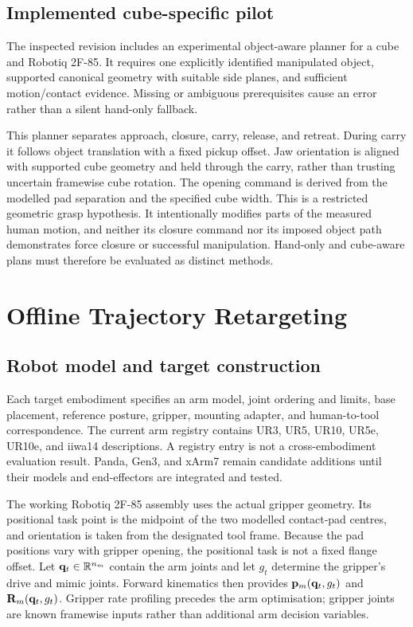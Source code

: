 \subsection{Implemented cube-specific pilot}

The inspected revision includes an experimental object-aware planner for
a cube and Robotiq 2F-85. It requires one explicitly identified manipulated
object, supported canonical geometry with suitable side planes, and
sufficient motion/contact evidence. Missing or ambiguous prerequisites
cause an error rather than a silent hand-only fallback.

This planner separates approach, closure, carry, release, and retreat.
During carry it follows object translation with a fixed pickup offset.
Jaw orientation is aligned with supported cube geometry and held through
the carry, rather than trusting uncertain framewise cube rotation. The
opening command is derived from the modelled pad separation and the
specified cube width. This is a restricted geometric grasp hypothesis.
It intentionally modifies parts of the measured human motion, and neither
its closure command nor its imposed object path demonstrates force closure
or successful manipulation. Hand-only and cube-aware plans must therefore
be evaluated as distinct methods.

\section{Offline Trajectory Retargeting}
\label{sec:retarget}

\subsection{Robot model and target construction}

Each target embodiment specifies an arm model, joint ordering and limits,
base placement, reference posture, gripper, mounting adapter, and
human-to-tool correspondence. The current arm registry contains UR3, UR5,
UR10, UR5e, UR10e, and iiwa14 descriptions. A registry entry is not a
cross-embodiment evaluation result. Panda, Gen3, and xArm7 remain candidate
additions until their models and end-effectors are integrated and tested.

The working Robotiq 2F-85 assembly uses the actual gripper geometry.
Its positional task point is the midpoint of the two modelled contact-pad
centres, and orientation is taken from the designated tool frame.
Because the pad positions vary with gripper opening, the positional task
is not a fixed flange offset. Let $\mathbf{q}_t\in\mathbb R^{n_m}$ contain the
arm joints and let $g_t$ determine the gripper's drive and mimic joints.
Forward kinematics then provides
$\mathbf p_m(\mathbf{q}_t,g_t)$ and $\mathbf R_m(\mathbf{q}_t,g_t)$.
Gripper rate profiling precedes the arm optimisation; gripper joints are
known framewise inputs rather than additional arm decision variables.

